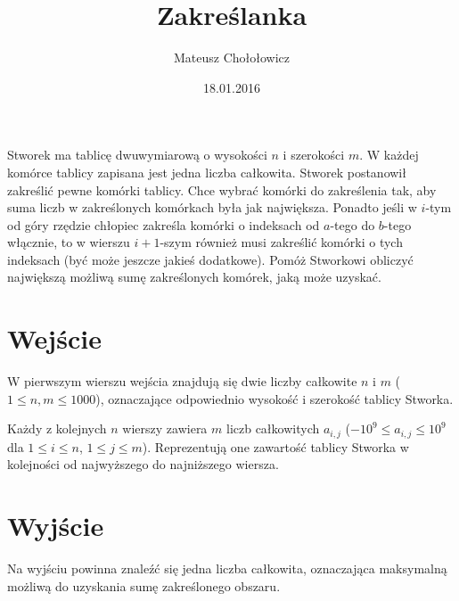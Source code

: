 \documentclass[zad,zawodnik,utf8]{sinol}
\title{Zakreślanka}
\author{Mateusz Chołołowicz} %
\date{18.01.2016}
\begin{document}
  \begin{tasktext}%
Stworek ma tablicę dwuwymiarową o wysokości $n$ i szerokości $m$. W każdej komórce tablicy zapisana jest
jedna liczba całkowita.
Stworek postanowił zakreślić pewne komórki tablicy. Chce wybrać komórki do zakreślenia tak, aby
suma liczb w zakreślonych komórkach była jak największa. Ponadto jeśli w $i$-tym od góry rzędzie chłopiec zakreśla
komórki o indeksach od $a$-tego do $b$-tego włącznie, to w wierszu $i+1$-szym również musi zakreślić komórki
o tych indeksach (być może jeszcze jakieś dodatkowe).
Pomóż Stworkowi obliczyć największą możliwą sumę zakreślonych komórek, jaką może uzyskać.

 \section{Wejście}
    
W pierwszym wierszu wejścia znajdują się dwie liczby całkowite $n$ i $m$ ($1 \leq n, m \leq 1000$), oznaczające odpowiednio
wysokość i szerokość tablicy Stworka.

Każdy z kolejnych $n$ wierszy zawiera $m$ liczb całkowitych 
$a_{i,j}$ ($-10^9 \leq a_{i,j} \leq 10^9$ dla $1 \leq i \leq n$, $1 \leq j \leq m$).
Reprezentują one zawartość tablicy Stworka w kolejności od najwyższego do najniższego wiersza.

  \section{Wyjście}
    Na wyjściu powinna znaleźć się jedna liczba całkowita, oznaczająca maksymalną możliwą do uzyskania sumę zakreślonego obszaru.

     \makecompactexample

  \end{tasktext}
\end{document}
